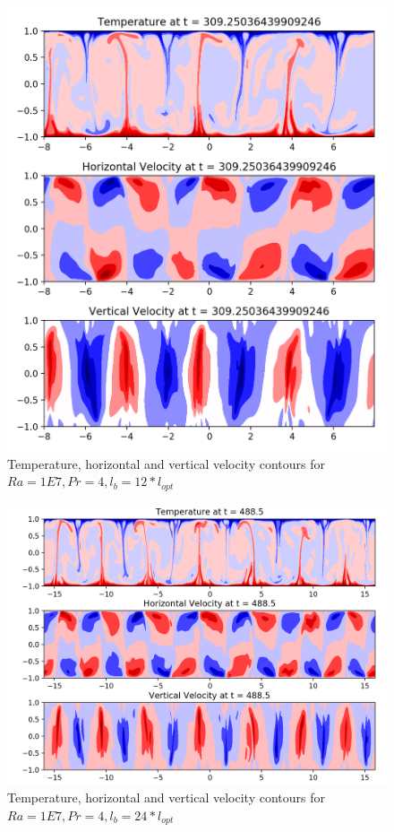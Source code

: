 \documentclass[12pt]{article}
\begin{document}
   \begin{figure}[!htb]
   	\includegraphics[width=\linewidth]{contours_1E7_4_12.png}
   	\caption{Temperature, horizontal and vertical velocity contours for $Ra = 1E7, Pr =4, l_b = 12* l_{opt} $ }
   	\label{fig:fig10}
   \end{figure}
   
   \begin{figure}[!htb]
   	\includegraphics[width=\linewidth]{contours_1E7_4_24.png}
   	\caption{Temperature, horizontal and vertical velocity contours for $Ra = 1E7, Pr =4, l_b = 24* l_{opt} $ }
   	\label{fig:fig11}
   \end{figure}
   
\end{document}
